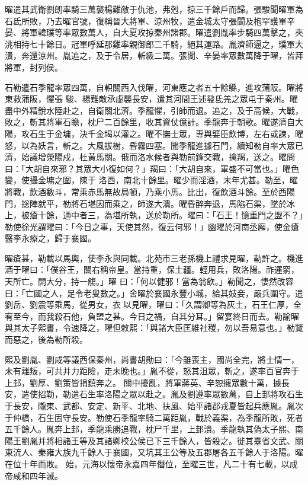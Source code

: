 \begin{pinyinscope}
 曜遣其武衛劉朗率騎三萬襲楊難敵于仇池，弗剋，掠三千餘戶而歸。張駿聞曜軍為石氐所敗，乃去曜官號，復稱晉大將軍、涼州牧，遣金城太守張閬及枹罕護軍辛晏、將軍韓璞等率眾數萬人，自大夏攻掠秦州諸郡。曜遣劉胤率步騎四萬擊之，夾洮相持七十餘日。冠軍呼延那雞率親御郎二千騎，絕其運路。胤濟師逼之，璞軍大潰，奔還涼州。胤追之，及于令居，斬級二萬。張閬、辛晏率眾數萬降于曜，皆拜將軍，封列侯。



 石勒遣石季龍率眾四萬，自軹關西入伐曜，河東應之者五十餘縣，進攻蒲阪。曜將東救蒲阪，懼張
 駿、楊難敵承虛襲長安，遣其河間王述發氐羌之眾屯于秦州。曜盡中外精銳水陸赴之，自衛關北濟。季龍懼，引師而退。追之，及于高候，大戰，敗之，斬其將軍石瞻，枕尸二百餘里，收其資仗億計。季龍奔于朝歌。曜遂濟自大陽，攻石生于金墉，決千金堨以灌之。曜不撫士眾，專與嬖臣飲博，左右或諫，曜怒，以為妖言，斬之。大風拔樹，昏霧四塞。聞季龍進據石門，續知勒自率大眾已濟，始議增滎陽戍，杜黃馬關。俄而洛水候者與勒前鋒交戰，擒羯，送之。曜問曰：「大胡自來邪？其眾大小復如何？」羯曰：「大胡自來，軍盛不可當也。」曜色變，使攝金墉之圍，陳于
 洛西，南北十餘里。曜少而淫酒，末年尤甚。勒至，曜將戰，飲酒數斗，常乘赤馬無故局頓，乃乘小馬。比出，復飲酒斗餘。至於西陽門，捴陣就平，勒將石堪因而乘之，師遂大潰。曜昏醉奔退，馬陷石渠，墜於冰上，被瘡十餘，通中者三，為堪所執，送於勒所。曜曰：「石王！憶重門之盟不？」勒使徐光謂曜曰：「今日之事，天使其然，復云何邪！」幽曜於河南丞廨，使金瘡醫李永療之，歸于襄國。



 曜瘡甚，勒載以馬輿，使李永與同載。北苑市三老孫機上禮求見曜，勒許之。機進酒于曜曰：「僕谷王，關右稱帝皇。當持重，保土疆。輕用兵，敗洛陽。祚運窮，天所亡。開大分，持一觴。」曜
 曰：「何以健邪！當為翁飲。」勒聞之，悽然改容曰：「亡國之人，足令老叟數之。」舍曜於襄國永豐小城，給其妓妾，嚴兵圍守。遣劉岳、劉震等乘馬，從男女，衣以見曜，曜曰：「久謂卿等為灰土，石王仁厚，全宥至今，而我殺石他，負盟之甚。今日之禍，自其分耳。」留宴終日而去。勒諭曜與其太子熙書，令速降之，曜但敕熙：「與諸大臣匡維社稷，勿以吾易意也。」勒覽而惡之，後為勒所殺。



 熙及劉胤、劉咸等議西保秦州，尚書胡勛曰：「今雖喪主，國尚全完，將士情一，未有離叛，可共并力距險，走未晚也。」胤不從，怒其沮眾，斬之，遂率百官奔于上邽，劉厚、劉策皆捐鎮奔之。
 關中擾亂，將軍蔣英、辛恕擁眾數十萬，據長安，遣使招勒，勒遣石生率洛陽之眾以赴之。胤及劉遵率眾數萬，自上邽將攻石生于長安，隴東、武都、安定、新平、北地、扶風、始平諸郡戎夏皆起兵應胤。胤次于仲橋，石生固守長安。勒使石季龍率騎二萬距胤，戰於義渠，為季龍所敗，死者五千餘人。胤奔上邽，季龍乘勝追戰，枕尸千里，上邽潰。季龍執其偽太子熙、南陽王劉胤并將相諸王等及其諸卿校公侯已下三千餘人，皆殺之。徙其臺省文武、關東流人、秦雍大族九千餘人于襄國，又坑其王公等及五郡屠各五千餘人于洛陽。曜在位十年而敗。
 始，元海以懷帝永嘉四年僭位，至曜三世，凡二十有七載，以成帝咸和四年滅。




\end{pinyinscope}
